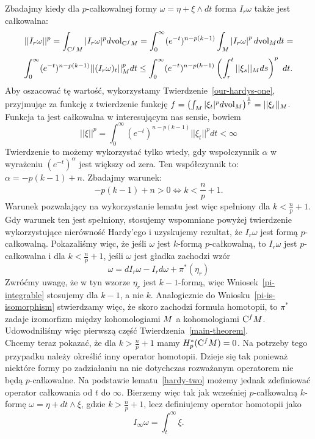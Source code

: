 \documentclass[licencjacka]{pracamgr}
\theoremstyle{definition}
\theoremstyle{definition}
\theoremstyle{plain}
\theoremstyle{plain}
\theoremstyle{plain}
\theoremstyle{plain}
\theoremstyle{plain}
\def\cfm{\ensuremath\mathrm{C}^fM}
\def\M{\ensuremath M}
\begin{document}
Zbadajmy kiedy dla $p$-całkowalnej formy $\omega = \eta + \xi \wedge dt$ forma
$I_r \omega$ także jest całkowalna:
\[
    ||I_r \omega ||^p = 
    \int_{\cfm} |I_r \omega|^p  d\text{vol}_{\cfm} =
    \int_0^\infty 
        (e^{-t})^{n-p(k-1)}
   \int_{\M} 
      \left| I_r \omega \right|^p d\text{vol}_{\M} dt =
\]
\[
    \int_0^\infty 
        (e^{-t})^{n-p(k-1)}
    || (I_r \omega)_t ||^p_{\M} dt 
   \leq
    \int_0^\infty 
        (e^{-t})^{n-p(k-1)}
    \left(\int_r^t || \xi_s ||_{\M} ds \right)^p~dt.
\] 
Aby oszacować tę wartość, wykorzystamy Twierdzenie~\ref{our-hardys-one},
przyjmując za funkcję z twierdzenie funkcję $f = \left( \int_{\M} |\xi_t|^p d
\text{vol}_{\M} \right)^{\frac{1}{p}} = ||\xi_t||_{\M}$.
Funkcja ta jest całkowalna w interesującym nas sensie, bowiem 
\[
||\xi||^p = 
    \int_0^\infty 
        (e^{-t})^{n-p(k-1)} ||\xi_t||^p dt < \infty
\]
Twierdzenie to możemy wykorzystać tylko wtedy, gdy wspołczynnik $\alpha$ w
wyrażeniu $(e^{-t})^\alpha$ jest większy od zera. Ten współczynnik to: $\alpha
= -p(k-1) + n$.  Zbadajmy warunek:
\[
    -p(k-1) + n > 0 \iff k < \frac{n}{p} + 1.
\]
Warunek pozwalający na wykorzystanie lematu jest więc spełniony dla $k <
\frac{n}{p} + 1$.  Gdy warunek ten jest spełniony, stosujemy wspomniane powyżej
twierdzenie wykorzystujące nierówność Hardy'ego i uzyskujemy rezultat, że $I_r
\omega$ jest formą $p$-całkowalną.  Pokazaliśmy więc, że jeśli $\omega$ jest
$k$-formą $p$-całkowalną, to  $I_r \omega$ jest $p$-całkowalna i dla $k <
\frac{n}{p} + 1$, jeśli $\omega$ jest gładka  zachodzi wzór
\[
    \omega = dI_r \omega - I_r d \omega + \pi^\ast 
    \left(
        \eta_{r}
    \right)
\]
Zwróćmy uwagę, że w tyn wzorze $\eta_r$ jest $k-1$-formą, więc
Wniosek~\ref{pi-integrable} stosujemy dla $k-1$, a nie $k$. Analogicznie do
Wniosku~\ref{pi-is-isomorphism} stwierdzamy więc, że skoro zachodzi 
formuła homotopii, to  $\pi^\ast$ zadaje izomorfizm między kohomologiami $\M$
a kohomologiami $\cfm$.
Udowodniliśmy więc pierwszą część Twierdzenia~\ref{main-theorem}. \\

Chcemy teraz pokazać, że dla $k > \frac{n}{p} + 1$ mamy $H^\ast_p(\cfm) = 0$.
Na potrzeby tego przypadku należy określić inny operator homotopii.  Dzieje się
tak ponieważ niektóre formy po zadziałaniu na nie dotychczas rozważanym
operatorem nie będą $p$-całkowalne. Na podstawie lematu~\ref{hardy-two} możemy
jednak zdefiniować operator całkowania od $t$ do $\infty$.
Bierzemy więc tak jak wcześniej $p$-całkowalną $k$-formę $\omega = \eta + dt \wedge \xi$,
 gdzie $k > \frac{n}{p} + 1$,  lecz definiujemy operator homotopii jako
\[
I_\infty \omega = \int_t^\infty \xi.
\]
\end{document}
